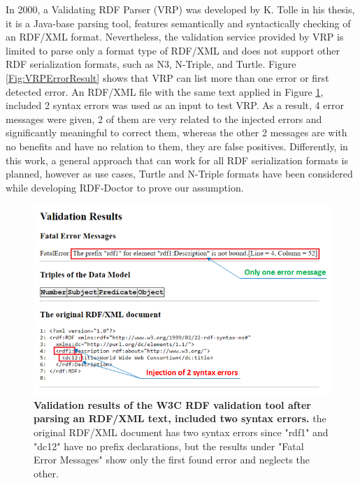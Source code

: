  In 2000, a Validating RDF Parser (VRP) \cite{karsten:Thesis:2000} was developed by K. Tolle in his thesis, it is a Java-base parsing tool, features semantically and syntactically checking of an RDF/XML format. Nevertheless, the validation service provided by VRP is limited to parse only a format type of RDF/XML and does not support other RDF serialization formats, such as N3, N-Triple, and Turtle. Figure \ref{Fig:VRPErrorResult} shows that VRP can list more than one error or first detected error. An RDF/XML file with the same text applied in Figure \ref{Fig:errorW3RDFValidator}, included 2 syntax errors was used as an input to test VRP. As a result, 4 error messages were given, 2 of them are very related to the injected errors and significantly meaningful to correct them, whereas the other 2 messages are with no benefits and have no relation to them, they are false positives. Differently, in this work, a general approach that can work for all RDF serialization formats is planned, however as use cases, Turtle and N-Triple formats have been considered  while developing RDF-Doctor to prove our assumption. 
 
 \begin{figure}[ht]
		\begin{center}
			\setlength\belowcaptionskip{-7mm}
			\includegraphics[scale=0.8,angle=0]{images/errorW3RDFValidator.png}
			\caption{\textbf{Validation results of the W3C RDF validation tool \cite{W3C:Validation:Online} after parsing an RDF/XML text, included two syntax errors.} the original RDF/XML document has two syntax errors since "rdf1" and "dc12" have no prefix declarations, but the results under "Fatal Error Messages"  show only the first found error and neglects the other.}
			\label{Fig:errorW3RDFValidator}
		\end{center}
	\end{figure}
